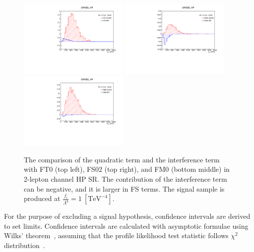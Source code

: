 \begin{figure}[ht]
    \centering
        \includegraphics[width=0.47\textwidth]{figures/aQGC/FT0_0ptag1pfat0pjet_0ptv_SRVBS_HP_MllJ.pdf}
    	\includegraphics[width=0.47\textwidth]{figures/aQGC/FS02_0ptag1pfat0pjet_0ptv_SRVBS_HP_MllJ.pdf}
        \includegraphics[width=0.47\textwidth]{figures/aQGC/FM0_0ptag1pfat0pjet_0ptv_SRVBS_HP_MllJ.pdf}
        \caption{The comparison of the quadratic term and the interference term with FT0 (top left), FS02 (top right), and FM0 (bottom middle) in 2-lepton channel HP SR. The contribution of the interference term can be negative, and it is larger in FS terms. The signal sample is produced at $\frac{f_i}{\Lambda^4} = 1~[\mathrm{TeV}^{-4}]$. }
        \label{fig:quadint}
\end{figure}
For the purpose of excluding a signal hypothesis, confidence intervals are derived to set limits. 
Confidence intervals are calculated with asymptotic formulae using Wilks' theorem~\cite{10.1214/aoms/1177732360}, assuming that the profile likelihood test statistic follows $\chi^2$ distribution~\cite{Cowan:2010js}.

